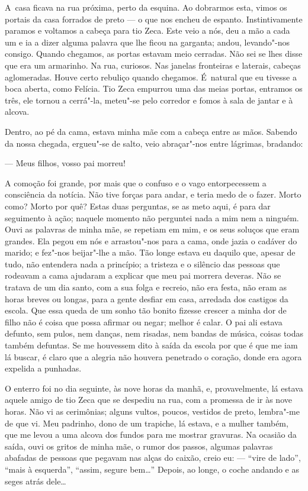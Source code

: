 \begin{linenumbers}
A~casa ficava na rua próxima, perto da esquina. Ao dobrarmos esta, vimos
os portais da casa forrados de preto --- o que nos encheu de espanto.
Instintivamente paramos e voltamos a cabeça para tio Zeca. Este veio a
nós, deu a mão a cada um e ia a dizer alguma palavra que lhe ficou na
garganta; andou, levando"-nos consigo. Quando chegamos, as portas estavam
meio cerradas. Não sei se lhes disse que era um armarinho. Na rua,
curiosos. Nas janelas fronteiras e laterais, cabeças aglomeradas. Houve
certo rebuliço quando chegamos. É~natural que eu tivesse a boca aberta,
como Felícia. Tio Zeca empurrou uma das meias portas, entramos os três,
ele tornou a cerrá"-la, meteu"-se pelo corredor e fomos à sala de jantar e
à alcova.

Dentro, ao pé da cama, estava minha mãe com a cabeça entre as mãos.
Sabendo da nossa chegada, ergueu"-se de salto, veio abraçar"-nos entre
lágrimas, bradando:

--- Meus filhos, vosso pai morreu!

A comoção foi grande, por mais que o confuso e o vago entorpecessem a
consciência da notícia. Não tive forças para andar, e teria medo de o
fazer. Morto como? Morto por quê? Estas duas perguntas, se as meto aqui,
é para dar seguimento à ação; naquele momento não perguntei nada a mim
nem a ninguém. Ouvi as palavras de minha mãe, se repetiam em mim, e os
seus soluços que eram grandes. Ela pegou em nós e arrastou"-nos para a
cama, onde jazia o cadáver do marido; e fez"-nos beijar"-lhe a mão. Tão
longe estava eu daquilo que, apesar de tudo, não entendera nada a
princípio; a tristeza e o silêncio das pessoas que rodeavam a cama
ajudaram a explicar que meu pai morrera deveras. Não se tratava de um
dia santo, com a sua folga e recreio, não era festa, não eram as horas
breves ou longas, para a gente desfiar em casa, arredada dos castigos da
escola. Que essa queda de um sonho tão bonito fizesse crescer a minha
dor de filho não é coisa que possa afirmar ou negar; melhor é calar. O
pai ali estava defunto, sem pulos, nem danças, nem risadas, nem bandas
de música, coisas todas também defuntas. Se me houvessem dito à saída da
escola por que é que me iam lá buscar, é claro que a alegria não houvera
penetrado o coração, donde era agora expelida a punhadas.

O enterro foi no dia seguinte, às nove horas da manhã, e, provavelmente,
lá estava aquele amigo de tio Zeca que se despediu na rua, com a
promessa de ir às nove horas. Não vi as cerimônias; alguns vultos,
poucos, vestidos de preto, lembra"-me de que vi. Meu padrinho, dono de um
trapiche, lá estava, e a mulher também, que me levou a uma alcova dos
fundos para me mostrar gravuras. Na ocasião da saída, ouvi os gritos de
minha mãe, o rumor dos passos, algumas palavras abafadas de pessoas que
pegavam nas alças do caixão, creio eu: --- ``vire de lado'', ``mais à
esquerda'', ``assim, segure bem\ldots{}'' Depois, ao longe, o coche andando e
as seges atrás dele\ldots{}


\end{linenumbers}
